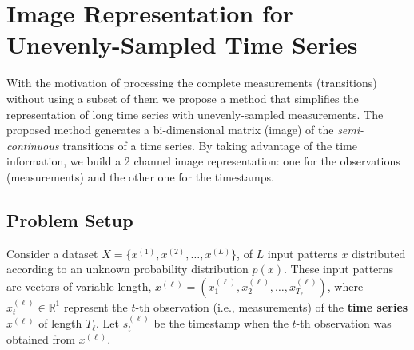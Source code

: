\section{Image Representation for Unevenly-Sampled Time Series}

With the motivation of processing the complete measurements (transitions) without using a subset of them we propose a method that simplifies the representation of long time series with unevenly-sampled measurements. The proposed method generates a bi-dimensional matrix (image) of the \textit{semi-continuous} transitions of a time series. By taking advantage of the time information, we build a 2 channel image representation: one for the observations (measurements) and the other one for the timestamps.

\subsection{Problem Setup}
Consider a dataset $X = \{x^{(1)}, x^{(2)}, \ldots, x^{(L)}\}$, of $L$ input patterns $x$ distributed according to an unknown probability distribution $p(x)$.
These input patterns are vectors of variable length, $x^{(\ell)}= (x^{(\ell)}_1, x^{(\ell)}_2, \ldots, x^{(\ell)}_{T_{\ell}})$, where $x^{(\ell)}_t \in \mathbb{R}^1$ represent the $t$-th observation (i.e., measurements) of the \textbf{time series} $x^{(\ell)}$ of length $T_{\ell}$. Let $s^{(\ell)}_t$ be the timestamp when the $t$-th observation was obtained from $x^{(\ell)}$. 





